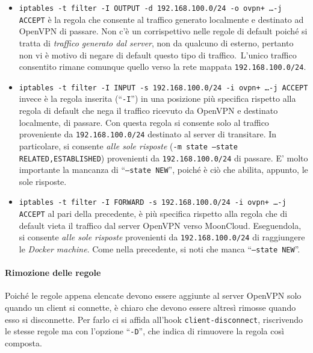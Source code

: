 		\begin{itemize}
			\item \texttt{iptables -t filter -I OUTPUT -d 192.168.100.0/24 -o ovpn+ \ldots -j ACCEPT}
			      è la regola che consente al traffico generato localmente e destinato ad OpenVPN
			      di passare. Non c'è un corrispettivo nelle regole di default poiché si tratta di
			      \textit{traffico generato dal server}, non da qualcuno di esterno, pertanto
			      non vi è motivo di negare di default questo tipo di traffico.\
			      L'unico traffico consentito rimane comunque quello verso la rete mappata
			      \texttt{192.168.100.0/24}.
			\item \texttt{iptables -t filter -I INPUT -s 192.168.100.0/24 -i ovpn+ \ldots -j ACCEPT}
				  invece è la regola inserita (``\texttt{-I}'') in una posizione più specifica rispetto
				  alla regola di default
			      che nega il traffico ricevuto da OpenVPN e destinato localmente, di passare.
			      Con questa regola si consente solo al traffico proveniente da \texttt{192.168.100.0/24}
			      destinato al server di transitare. In particolare, si consente \textit{alle sole risposte}
			      (\texttt{-m state --state RELATED,ESTABLISHED})
			      provenienti da \texttt{192.168.100.0/24}
			      di passare. E' molto importante la mancanza di ``\texttt{--state NEW}'',
			      poiché è ciò che abilita, appunto, le sole risposte.
			\item \texttt{iptables -t filter -I FORWARD -s 192.168.100.0/24 -i ovpn+ \ldots -j ACCEPT}
			      al pari della precedente, è più specifica rispetto alla regola che di default vieta il traffico
			      dal server OpenVPN verso MoonCloud.
			      Eseguendola, si consente \textit{alle sole risposte}
			      provenienti da \texttt{192.168.100.0/24}
			      di raggiungere le \textit{Docker machine}. Come nella precedente, si noti che manca
			      ``\texttt{--state NEW}''.
		\end{itemize}
		
		
		\paragraph{Rimozione delle regole}
		Poiché le regole appena elencate devono essere aggiunte al server OpenVPN solo quando
		un client si connette, è chiaro che devono essere altresì rimosse quando esso si disconnette.
		Per farlo ci si affida all'hook \texttt{client-disconnect}, riscrivendo
		le stesse regole ma con l'opzione ``\texttt{-D}'', che indica di rimuovere la regola così
		composta.
		
